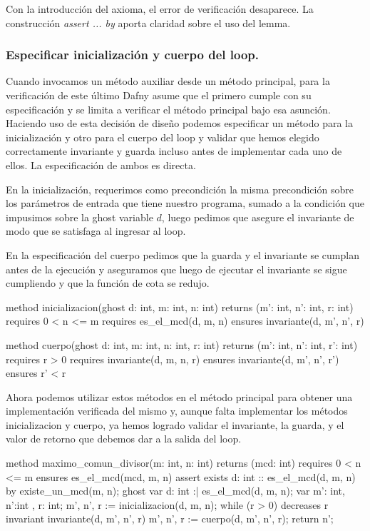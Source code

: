 \documentclass[12pt, a4paper, openany, fleqn]{book}
\begin{document}
    Con la introducción del axioma, el error de verificación desaparece. La construcción \textit{assert ... by} aporta claridad sobre el uso del lemma.

    \subsubsection*{Especificar inicialización y cuerpo del loop.}

    Cuando invocamos un método auxiliar desde un método principal, para la verificación de este último Dafny asume que el primero cumple con su especificación y se limita a verificar el método principal bajo esa asunción. Haciendo uso de esta decisión de diseño podemos especificar un método para la inicialización y otro para el cuerpo del loop y validar que hemos elegido correctamente invariante y guarda incluso antes de implementar cada uno de ellos. La especificación de ambos es directa.

    En la inicialización, requerimos como precondición la misma precondición sobre los parámetros de entrada que tiene nuestro programa, sumado a la condición que impusimos sobre la ghost variable $d$, luego pedimos que asegure el invariante de modo que se satisfaga al ingresar al loop.

    En la especificación del cuerpo pedimos que la guarda y el invariante se cumplan antes de la ejecución y aseguramos que luego de ejecutar el invariante se sigue cumpliendo y que la función de cota se redujo.

    \begin{dafny}
method inicializacion(ghost d: int, m: int, n: int)
    returns (m': int, n': int, r: int)
    requires 0 < n <= m
    requires es_el_mcd(d, m, n)
    ensures invariante(d, m', n', r)

method cuerpo(ghost d: int, m: int, n: int, r: int)
    returns (m': int, n': int, r': int)
    requires r > 0
    requires invariante(d, m, n, r)
    ensures invariante(d, m', n', r')
    ensures r' < r
    \end{dafny}

    Ahora podemos utilizar estos métodos  en el método principal para obtener una implementación verificada del mismo y, aunque falta implementar los métodos inicializacion y cuerpo, ya hemos logrado validar el invariante, la guarda, y el valor de retorno que debemos dar a la salida del loop.

    \begin{dafny}
method maximo_comun_divisor(m: int, n: int) returns (mcd: int)
    requires 0 < n <= m
    ensures es_el_mcd(mcd, m, n)
{
    assert exists d: int :: es_el_mcd(d, m, n) by {
        existe_un_mcd(m, n);
    }
    ghost var d: int :| es_el_mcd(d, m, n);
    var m': int, n':int , r: int;
    m', n', r := inicializacion(d, m, n);
    while (r > 0)
        decreases r
        invariant invariante(d, m', n', r)
    {
         m', n', r := cuerpo(d, m', n', r);
    }
    return n';
}
    \end{dafny}
\end{document}
